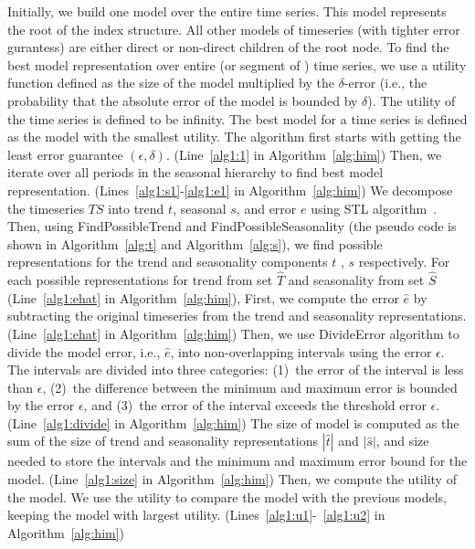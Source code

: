 \documentclass[10pt,conference,letterpaper]{IEEEtran}
\begin{document}
Initially, we build one model  over the entire time series. This model represents the root of the index structure. All other models of timeseries (with tighter error gurantess) are  either direct or non-direct children of the root node.
To find the best model representation over entire (or segment of ) time series, we use a utility function defined as the size of the model multiplied by the $\delta$-error  (i.e., the probability that the absolute error of the model is bounded by $\delta$). The utility of the time series is defined to be infinity. The best model for a time series is defined as the model with the smallest utility. 
The algorithm first starts with getting the least error guarantee $(\epsilon, \delta)$. (Line~\ref{alg1:1} in Algorithm~\ref{alg:him})
 Then, we iterate over all periods in the seasonal hierarchy to find best model representation. (Lines~\ref{alg1:s1}-\ref{alg1:e1} in Algorithm~\ref{alg:him})
We decompose the timeseries $TS$ into trend $t$, seasonal $s$, and error $e$ using STL algorithm~\cite{STL}. Then, using FindPossibleTrend and FindPossibleSeasonality (the pseudo code is shown in Algorithm~\ref{alg:t} and Algorithm~\ref{alg:s}), we find possible representations for the trend and seasonality components $t$ , $s$ respectively. 
For each possible representations for trend from  set $\hat{T}$ and seasonality from set $\hat{S}$ (Line~\ref{alg1:ehat} in Algorithm~\ref{alg:him}), First, we compute the error $\hat{e}$ by subtracting the original timeseries from the trend and seasonality representations. (Line~\ref{alg1:ehat} in Algorithm~\ref{alg:him}) Then, we use DivideError algorithm to divide the model error, i.e., $\hat{e}$, into non-overlapping intervals using the error $\epsilon$. The intervals are divided into three categories: (1)~the error of the interval is less than $\epsilon$, (2)~the difference between the minimum and maximum error is bounded by the error $\epsilon$, and (3)~the error of the interval exceeds the threshold error $\epsilon$. (Line~\ref{alg1:divide} in Algorithm~\ref{alg:him}) 
The size of model is computed as the sum of the size of trend and seasonality representations $|\hat{t}|$ and $|\hat{s}|$, and size needed to store the intervals and the minimum and maximum error bound for the model.
(Line~\ref{alg1:size} in Algorithm~\ref{alg:him}) Then, we compute the utility of the model. We use the utility to compare the model with the previous models, keeping the model with largest utility. (Lines~\ref{alg1:u1}-~\ref{alg1:u2} in Algorithm~\ref{alg:him}) 
\end{document}
